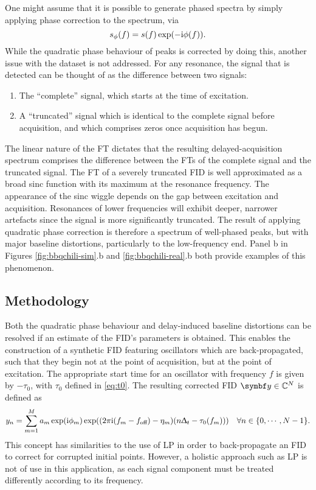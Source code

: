 One might assume that it is possible to generate phased spectra by simply
applying phase correction to the spectrum, via
\begin{equation}
    s_{\phi}(f) = s(f) \exp(-\mathrm{i} \phi(f)).
        \label{eq:spec-phase-chili}
\end{equation}
While the quadratic phase behaviour of peaks is corrected by doing this,
another issue with the dataset is not addressed.
For any resonance, the signal that is detected can be thought of as
the difference between two signals:
\begin{enumerate}
    \item The ``complete'' signal, which starts at the time of excitation.
    \item A ``truncated'' signal which is identical to the complete signal
        before acquisition, and which comprises zeros once acquisition has
        begun.
\end{enumerate}
The linear nature of the \ac{FT} dictates that the
resulting delayed-acquisition spectrum comprises the difference between the
\acp{FT} of the complete signal and the truncated signal.  The \ac{FT} of a
severely
truncated \ac{FID} is well approximated as a broad sinc function with its maximum
at the resonance frequency. The appearance of the sinc wiggle depends on
the gap between excitation and acquisition. Resonances of lower
frequencies will exhibit deeper, narrower artefacts since the signal is more
significantly truncated. The result of applying quadratic phase correction is
therefore a spectrum of well-phased peaks, but with major baseline distortions,
particularly to the low-frequency end. Panel b in
Figures \ref{fig:bbqchili-sim}.b and \ref{fig:bbqchili-real}.b both provide
examples of this phenomenon.

\subsection{Methodology}
Both the quadratic phase behaviour and delay-induced baseline distortions can
be resolved if an estimate of the \ac{FID}'s parameters is obtained. This enables
the construction of a synthetic \ac{FID} featuring oscillators which are
back-propagated, such that they begin not at the point of acquisition, but at
the point of excitation. The appropriate start time for an oscillator with
frequency $f$ is given by $-\tau_0$, with $\tau_0$ defined in \cref{eq:t0}. The
resulting corrected \ac{FID} $\by \in \mathbb{C}^N$ is defined as
\begin{equation}
    y_n = \sum_{m=1}^{M} a_m \exp(\mathrm{i} \phi_m) \exp((2 \pi \mathrm{i} (f_m - f_{\text{off}}) - \eta_m) (n \Updelta_t - \tau_0(f_m)))\quad
        \forall n \in \lbrace 0, \cdots, N-1 \rbrace.
    \label{eq:backprop}
\end{equation}
This concept has similarities to the use of \ac{LP} in order to back-propagate
an \ac{FID} to correct for corrupted initial points. However, a holistic
approach such as \ac{LP} is not of use in this application, as each signal
component must be treated differently according to its frequency.

